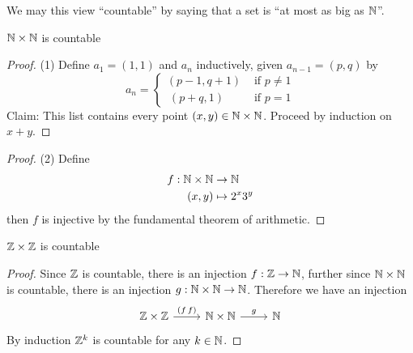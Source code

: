 \documentclass{article}
\begin{document}
We may this view ``countable'' by saying that a set is ``at most as big as $\mathbb{N}$''.

\begin{nthm}\label{th:5-4}
    $\mathbb{N} \times \mathbb{N}$ is countable
\end{nthm}
\begin{proof} (1)
    Define $a_1 = (1, 1)$ and $a_n$ inductively, given $a_{n-1} = (p, q)$ by
    \[
        a_n = \begin{cases}
            (p-1, q+1) & \text{ if } p \neq 1 \\\
            (p + q, 1) & \text{ if } p = 1
        \end{cases}  
    \]
    Claim: This list contains every point $(x, y) \in \mathbb{N} \times \mathbb{N}$.
    Proceed by induction on $x + y$.
\end{proof}
\begin{proof} (2)
    Define
    \begin{align*}
        f : \mathbb{N} \times \mathbb{N} &\rightarrow \mathbb{N} \\
        (x, y) &\mapsto 2^x3^y
    \end{align*}
    then $f$ is injective by the fundamental theorem of arithmetic.
\end{proof}

\begin{ncor}\label{cor:5-5}
    $\mathbb{Z} \times \mathbb{Z}$ is countable
\end{ncor}
\begin{proof}
    Since $\mathbb{Z}$ is countable, there is an injection $f: \mathbb{Z} \rightarrow \mathbb{N}$,
    further since $\mathbb{N} \times \mathbb{N}$ is countable, there is an injection $g: \mathbb{N} \times \mathbb{N} \rightarrow \mathbb{N}$.
    Therefore we have an injection
    \[
        \begin{tikzcd}
            \Z \times \Z \arrow[r, "(f\,f)"] & \N \times \N \arrow[r, "g"] & \N
        \end{tikzcd}
    \]
    By induction $\mathbb{Z}^k$ is countable for any $k \in \mathbb{N}$. 
\end{proof}
\end{document}
